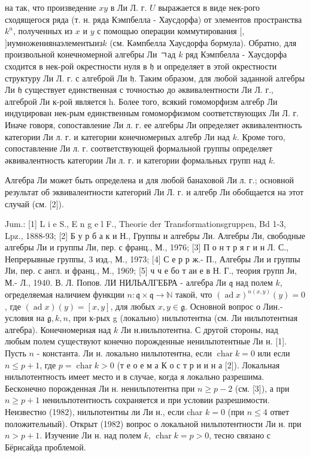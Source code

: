 \documentclass[10pt]{article}
\begin{document}
на так, что произведение $x y$ в Ли Л. г. $U$ выражается в виде нек-рого сходящегося ряда (т. н. ряда Кэмпбелла - Хаусдорфа) от элементов пространства $k^{n}$, полученных из $x$ и $y$ с помощью операции коммутирования $[$,$] и умножения на элементы из k$ (см. Кәмпбелла Хаусдорфа бормула). Обратно, для произвольной конечномерной алгебры Ли ㄱад $k$ ряд Кэмпбелла - Хаусдорфа сходится в нек-рой окрестности нуля в $\mathfrak{h}$ и определяет в этой окрестности структуру Ли Л. г. с алгеброй Ли $\mathfrak{h}$. Таким образом, для любой заданной алгебры Ли $\mathfrak{h}$ существует единственная с точностью до әквивалентности Ли Л. г., алгеброй Ли к-рой является h. Более того, всякий гомоморфизм алгебр Ли индуцирован нек-рым единственным гомоморфизмом соответствующих Ли Л. г. Иначе говоря, сопоставление Ли л. г. ее алгебры Ли определяет әквивалентность категории Ли л. г. и категории конечномерных алгебр Ли над $k$. Кроме того, сопоставление Ли л. г. соответствующей формальной группы определяет әквивалентность категории Ли л. г. и категории формальных групп над $k$.



Алгебра Ли может быть определена и для любой банаховой Ли л. г.; основной результат об эквивалентности категорий Ли Л. г. и алгебр Ли обобщается на этот случай (см. [2]).



Jum.: [1] L i e S., E n g e l F., Theorie der Transformationsgruppen, Bd 1-3, Lpz., 1888-93; [2] Б у р б а к и Н., Группы и алгебры Ли. Алгебры Ли, свободные алгебры Ли и группы Ли, пер. с франц., М., 1976; [3] П о н т р я г и н Л. С., Непрерывные группы, 3 изд., М., 1973; [4] С е р р ж.- П., Алгебры Ли и группы ЈІи, пер. с англ. и франц., М., 1969; [5] ч ч е бо т аи е в Н. Г., теория групп Ји, М.- Л., 1940. В. Л. Попов. ЛИ НИЛЬАЛГЕБРА - алгебра Ли $\mathfrak{q}$ над полем $k$, огределяемая наличием функции $n: \mathfrak{q} \times \mathfrak{q} \rightarrow \mathbb{N}$ такой, что $(\operatorname{ad} x)^{n(x, y)}(y)=0$, где $(\operatorname{ad} x)(y)=[x, y]$, для любых $x, y \in \mathfrak{g}$. Основной вопрос о Лин.- условия на $\mathfrak{g}, k, n$, при к-рых g (локально) нильпотентна (см. Ли нильпотентная алгебра). Конечномерная над $k$ Ли н.нильпотентна. С другой стороны, над любым полем существуют конечно порожденные ненильпотентные Ли н. [1]. Пусть $n$ - константа. Ли н. локально нильпотентна, если $\operatorname{char} k=0$ или если $n \leqslant p+1$, где $p=\operatorname{char} k>0$ (т е о е м а К о с т р и и н а [2]). Локальная нильпотентность имеет место и в случае, когда я локально разрешима. Бесконечно порожденная Ли н. ненильпотентна при $n \geqslant p-2$ (см. [3]), а при $n \geqslant p+1$ ненильпотентность сохраняется и при условии разрешимости. Неизвестно (1982), нильпотентны ли Ли н., если char $k=0$ (при $n \leqslant 4$ ответ положительный). Открыт (1982) вопрос о локальной нильпотентности Ли н. при $n>p+1$. Изучение Ли н. над полем $k$, $\operatorname{char} k=p>0$, тесно связано с Бёрнсайда проблемой.
\end{document}
